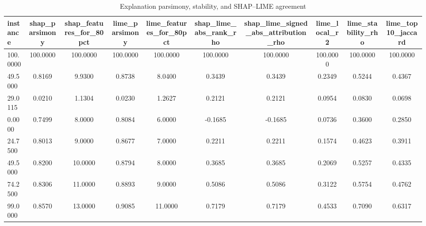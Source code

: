 \begin{table}
\centering
\caption{Explanation parsimony, stability, and SHAP--LIME agreement}
\label{tab:explanation_quality}
\begin{tabular}{lccccccccc}
\toprule
instance & shap_parsimony & shap_features_for_80pct & lime_parsimony & lime_features_for_80pct & shap_lime_abs_rank_rho & shap_lime_signed_abs_attribution_rho & lime_local_r2 & lime_stability_rho & lime_top10_jaccard \\
\midrule
100.0000 & 100.0000 & 100.0000 & 100.0000 & 100.0000 & 100.0000 & 100.0000 & 100.0000 & 100.0000 & 100.0000 \\
49.5000 & 0.8169 & 9.9300 & 0.8738 & 8.0400 & 0.3439 & 0.3439 & 0.2349 & 0.5244 & 0.4367 \\
29.0115 & 0.0210 & 1.1304 & 0.0230 & 1.2627 & 0.2121 & 0.2121 & 0.0954 & 0.0830 & 0.0698 \\
0.0000 & 0.7499 & 8.0000 & 0.8084 & 6.0000 & -0.1685 & -0.1685 & 0.0736 & 0.3600 & 0.2850 \\
24.7500 & 0.8013 & 9.0000 & 0.8677 & 7.0000 & 0.2211 & 0.2211 & 0.1574 & 0.4623 & 0.3911 \\
49.5000 & 0.8200 & 10.0000 & 0.8794 & 8.0000 & 0.3685 & 0.3685 & 0.2069 & 0.5257 & 0.4335 \\
74.2500 & 0.8306 & 11.0000 & 0.8893 & 9.0000 & 0.5086 & 0.5086 & 0.3122 & 0.5754 & 0.4762 \\
99.0000 & 0.8570 & 13.0000 & 0.9085 & 11.0000 & 0.7179 & 0.7179 & 0.4533 & 0.7090 & 0.6317 \\
\bottomrule
\end{tabular}
\end{table}
